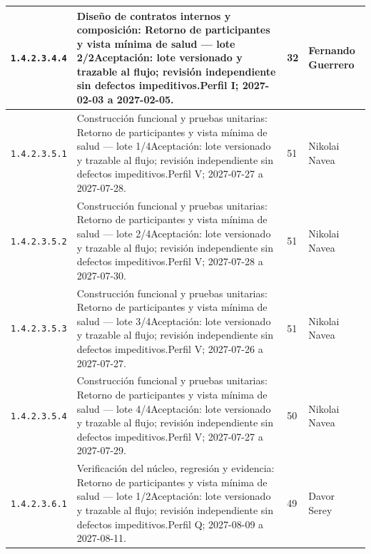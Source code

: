 \begin{longtable}{L{29mm}L{80mm}R{12mm}L{28mm}}
\texttt{1.\allowbreak{}4.\allowbreak{}2.\allowbreak{}3.\allowbreak{}4.\allowbreak{}4} & Diseño de contratos internos y composición: Retorno de participantes y vista mínima de salud — lote 2/2\newline Aceptación: lote versionado y trazable al flujo; revisión independiente sin defectos impeditivos.\newline Perfil I; 2027-02-03 a 2027-02-05. & 32 & Fernando Guerrero\\\hline
\texttt{1.\allowbreak{}4.\allowbreak{}2.\allowbreak{}3.\allowbreak{}5.\allowbreak{}1} & Construcción funcional y pruebas unitarias: Retorno de participantes y vista mínima de salud — lote 1/4\newline Aceptación: lote versionado y trazable al flujo; revisión independiente sin defectos impeditivos.\newline Perfil V; 2027-07-27 a 2027-07-28. & 51 & Nikolai Navea\\\hline
\texttt{1.\allowbreak{}4.\allowbreak{}2.\allowbreak{}3.\allowbreak{}5.\allowbreak{}2} & Construcción funcional y pruebas unitarias: Retorno de participantes y vista mínima de salud — lote 2/4\newline Aceptación: lote versionado y trazable al flujo; revisión independiente sin defectos impeditivos.\newline Perfil V; 2027-07-28 a 2027-07-30. & 51 & Nikolai Navea\\\hline
\texttt{1.\allowbreak{}4.\allowbreak{}2.\allowbreak{}3.\allowbreak{}5.\allowbreak{}3} & Construcción funcional y pruebas unitarias: Retorno de participantes y vista mínima de salud — lote 3/4\newline Aceptación: lote versionado y trazable al flujo; revisión independiente sin defectos impeditivos.\newline Perfil V; 2027-07-26 a 2027-07-27. & 51 & Nikolai Navea\\\hline
\texttt{1.\allowbreak{}4.\allowbreak{}2.\allowbreak{}3.\allowbreak{}5.\allowbreak{}4} & Construcción funcional y pruebas unitarias: Retorno de participantes y vista mínima de salud — lote 4/4\newline Aceptación: lote versionado y trazable al flujo; revisión independiente sin defectos impeditivos.\newline Perfil V; 2027-07-27 a 2027-07-29. & 50 & Nikolai Navea\\\hline
\texttt{1.\allowbreak{}4.\allowbreak{}2.\allowbreak{}3.\allowbreak{}6.\allowbreak{}1} & Verificación del núcleo, regresión y evidencia: Retorno de participantes y vista mínima de salud — lote 1/2\newline Aceptación: lote versionado y trazable al flujo; revisión independiente sin defectos impeditivos.\newline Perfil Q; 2027-08-09 a 2027-08-11. & 49 & Davor Serey\\\hline

\end{longtable}
